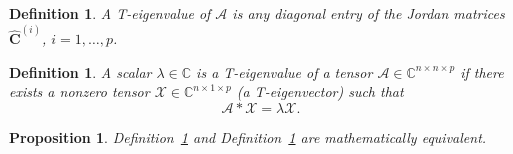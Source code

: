 \documentclass[pdflatex,sn-mathphys-ay]{sn-jnl}
\newcommand{\T}[1]{\mathcal{#1}}    %
\newcommand{\M}[1]{\bm{#1}}     %
\newcommand{\C}{\mathbb{C}}         %
\theoremstyle{thmstyleone}
\newtheorem{proposition}[theorem]{Proposition}
\theoremstyle{thmstyletwo}
\theoremstyle{thmstylethree}
\newtheorem{definition}[theorem]{Definition}
\numberwithin{equation}{section}
\begin{document}
\begin{definition}
\label{def:jordan}
A \emph{T-eigenvalue} of $\T{A}$ is any diagonal entry of the Jordan matrices $\widehat{\M{C}}^{(i)}$, $i=1,\dots,p$.
\end{definition}

\begin{definition}
\label{def:eigen_eq}
A scalar $\lambda \in \C$ is a \emph{T-eigenvalue} of a tensor $\T{A} \in \C^{n \times n \times p}$ if there exists a nonzero tensor $\T{X} \in \C^{n \times 1 \times p}$ (a T-eigenvector) such that
$$ \T{A} * \T{X} = \lambda \T{X}. $$
\end{definition}

\begin{proposition}
\label{prop:eigen_equiv}
Definition~\ref{def:jordan} and Definition~\ref{def:eigen_eq} are mathematically equivalent.
\end{proposition}
\end{document}
